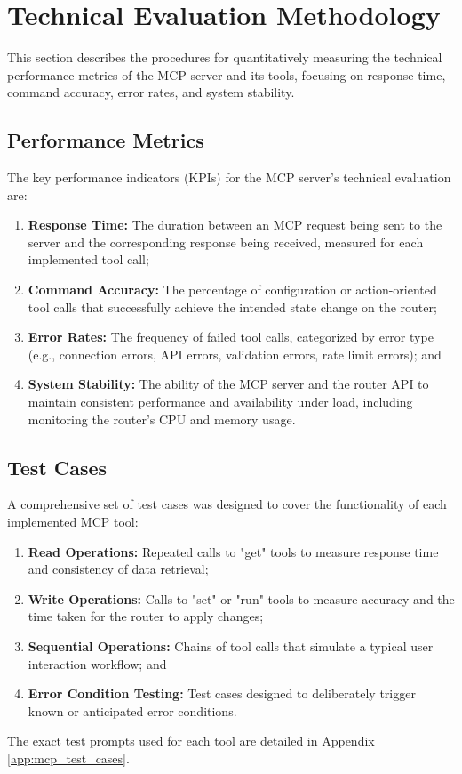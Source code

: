 \section{Technical Evaluation Methodology}
This section describes the procedures for quantitatively measuring the technical performance metrics of the MCP server and its tools, focusing on response time, command accuracy, error rates, and system stability.
\subsection{Performance Metrics}
The key performance indicators (KPIs) for the MCP server's technical evaluation are:
\begin{enumerate}
\item \textbf{Response Time:} The duration between an MCP request being sent to the server and the corresponding response being received, measured for each implemented tool call;
\item \textbf{Command Accuracy:} The percentage of configuration or action-oriented tool calls that successfully achieve the intended state change on the router;
\item \textbf{Error Rates:} The frequency of failed tool calls, categorized by error type (e.g., connection errors, API errors, validation errors, rate limit errors); and
\item \textbf{System Stability:} The ability of the MCP server and the router API to maintain consistent performance and availability under load, including monitoring the router's CPU and memory usage.
\end{enumerate}
\subsection{Test Cases}
A comprehensive set of test cases was designed to cover the functionality of each implemented MCP tool:
\begin{enumerate}
\item \textbf{Read Operations:} Repeated calls to "get" tools to measure response time and consistency of data retrieval;
\item \textbf{Write Operations:} Calls to "set" or "run" tools to measure accuracy and the time taken for the router to apply changes;
\item \textbf{Sequential Operations:} Chains of tool calls that simulate a typical user interaction workflow; and
\item \textbf{Error Condition Testing:} Test cases designed to deliberately trigger known or anticipated error conditions.
\end{enumerate}
The exact test prompts used for each tool are detailed in Appendix \ref{app:mcp_test_cases}.
